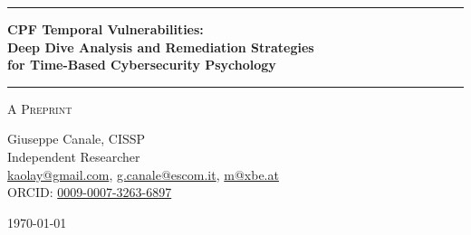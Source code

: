 \documentclass[11pt,a4paper]{article}
\begin{document}
\thispagestyle{empty}
\begin{center}

\vspace*{0.5cm}

\rule{\textwidth}{1.5pt}

\vspace{0.5cm}

{\LARGE \textbf{CPF Temporal Vulnerabilities:}}\\[0.3cm]
{\LARGE \textbf{Deep Dive Analysis and Remediation Strategies}}\\[0.3cm]
{\LARGE \textbf{for Time-Based Cybersecurity Psychology}}

\vspace{0.5cm}

\rule{\textwidth}{1.5pt}

\vspace{0.3cm}

{\large \textsc{A Preprint}}

\vspace{0.5cm}

{\Large Giuseppe Canale, CISSP}\\[0.2cm]
Independent Researcher\\[0.1cm]
\href{mailto:kaolay@gmail.com}{kaolay@gmail.com}, 
\href{mailto:g.canale@escom.it}{g.canale@escom.it}, 
\href{mailto:m8xbe.at}{m@xbe.at}\\[0.1cm]
ORCID: \href{https://orcid.org/0009-0007-3263-6897}{0009-0007-3263-6897}

\vspace{0.8cm}

{\large \today}

\vspace{1cm}

\end{center}
\end{document}
